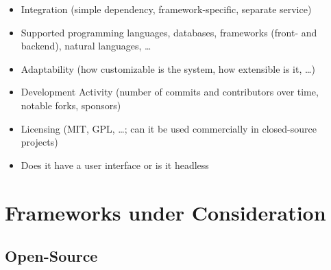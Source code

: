 \documentclass[runningheads]{llncs}
\begin{document}
\begin{itemize}
    \item Integration (simple dependency, framework-specific, separate service)
    \item Supported programming languages, databases, frameworks (front- and backend), natural languages, \ldots
    \item Adaptability (how customizable is the system, how extensible is it, \ldots)
    \item Development Activity (number of commits and contributors over time, notable forks, sponsors)
    \item Licensing (MIT, GPL, \ldots; can it be used commercially in closed-source projects)
    \item Does it have a user interface or is it headless
\end{itemize}

\section{Frameworks under Consideration}

\subsection{Open-Source}

\cite{ActiDoo, SieteValles, UserInfuser}
\end{document}

